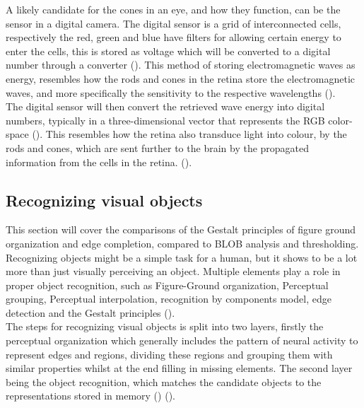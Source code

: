 \documentclass{article}
\newcommand{\goodcite}[1]{ {(\cite{#1})}}
\begin{document}
A likely candidate for the cones in an eye, and how they function, can be the sensor in a digital camera. The digital sensor is a grid of interconnected cells, respectively the red, green and blue have filters for allowing certain energy to enter the cells, this is stored as voltage which will be converted to a digital number through a converter\goodcite{IP}. This method of storing electromagnetic waves as energy, resembles how the rods and cones in the retina store the electromagnetic waves, and more specifically the sensitivity to the respective wavelengths\goodcite{hsp}.\\The digital sensor will then convert the retrieved wave energy into digital numbers, typically in a three-dimensional vector that represents the RGB color-space\goodcite{IP}. This resembles how the retina also transduce light into colour, by the rods and cones, which are sent further to the brain by the propagated information from the cells in the retina.\goodcite{hsp}.


\subsection{Recognizing visual objects}%
This section will cover the comparisons of the Gestalt principles of figure ground organization and edge completion, compared to BLOB analysis and thresholding.\medskip\\

Recognizing objects might be a simple task for a human, but it shows to be a lot more than just visually perceiving an object. Multiple elements play a role in proper object recognition, such as Figure-Ground organization, Perceptual grouping, Perceptual interpolation, recognition by components model, edge detection and the Gestalt principles\goodcite{hsp}.\\
The steps for recognizing visual objects is split into two layers, firstly the perceptual organization which generally includes the pattern of neural activity to represent edges and regions, dividing these regions and grouping them with similar properties whilst at the end filling in missing elements. The second layer being the object recognition, which matches the candidate objects to the representations stored in memory\goodcite{hsp}\goodcite{bieder}.
\end{document}
